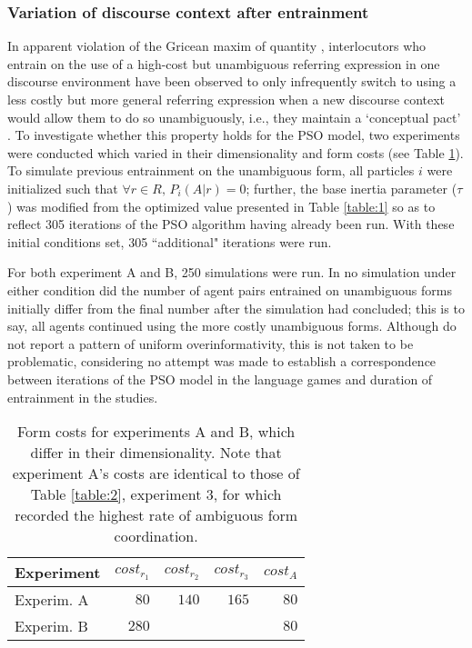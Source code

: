 \documentclass[a4paper,11pt]{article}
\begin{document}
\subsubsection{Variation of discourse context after entrainment}
In apparent violation of the Gricean maxim of quantity \cite{grice1975}, interlocutors who entrain on the use of a high-cost but unambiguous referring expression in one discourse environment have been observed to only infrequently switch to using a less costly but more general referring expression when a new discourse context would allow them to do so unambiguously, i.e., they maintain a `conceptual pact' \cite{brennan1996}. To investigate whether this property holds for the PSO model, two experiments were conducted which varied in their dimensionality and form costs (see Table \ref{table:4}). To simulate previous entrainment on the unambiguous form, all particles $i$ were initialized such that $\forall r \in R,\, P_i(A|r) = 0$; further, the base inertia parameter ($\tau$) was modified from the optimized value presented in Table \ref{table:1} so as to reflect 305 iterations of the PSO algorithm having already been run. With these initial conditions set, 305 ``additional" iterations were run.

For both experiment A and B, 250 simulations were run. In no simulation under either condition did the number of agent pairs entrained on unambiguous forms initially differ from the final number after the simulation had concluded; this is to say, all agents continued using the more costly unambiguous forms. Although \citeauthor{brennan1996} do not report a pattern of uniform overinformativity, this is not taken to be problematic, considering no attempt was made to establish a correspondence between iterations of the PSO model in the \citeauthor{rohde2012} language games and duration of entrainment in the \citeauthor{brennan1996} studies. 

\begin{table}
\begin{center}
    \begin{tabular}{ l r r r r }
    Experiment & $cost_{r_1}$ & $cost_{r_2}$ & $cost_{r_3}$ & $cost_A$\\ \hline
    Experim. A & $80$  & $140$ & $165$ & $80$ \\ \hline
    Experim. B & $280$ &       &       & $80$ \\ \hline
    \end{tabular}
    \caption{Form costs for experiments A and B, which differ in their dimensionality. Note that experiment A's costs are identical to those of Table \ref{table:2}, experiment 3, for which \citeauthor{rohde2012} recorded the highest rate of ambiguous form coordination.}
    \label{table:4}
\end{center}
\end{table}
\end{document}
